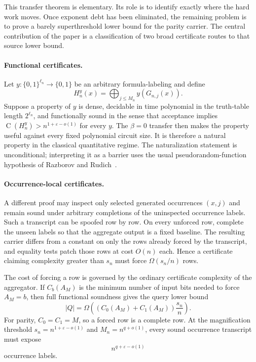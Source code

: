 \documentclass[11pt]{article}
\theoremstyle{definition}
\newcommand{\bits}{\{0,1\}}
\newcommand{\Ckt}{\operatorname{C}}
\newcommand{\eps}{\varepsilon}
\begin{document}
This transfer theorem is elementary. Its role is to identify exactly where the hard work moves. Once exponent debt has been eliminated, the remaining problem is to prove a barely superthreshold lower bound for the parity carrier. The central contribution of the paper is a classification of two broad certificate routes to that source lower bound.

\paragraph{Functional certificates.}
Let $y:\bits^{\ell_n}\to\bits$ be an arbitrary formula-labeling and define
\[
  H_n^y(x)=\bigoplus_{j\le M_n}y(G_{n,j}(x)).
\]
Suppose a property of $y$ is dense, decidable in time polynomial in the truth-table length $2^{\ell_n}$, and functionally sound in the sense that acceptance implies $\Ckt(H_n^y)>n^{1+\eps-o(1)}$ for every $y$. The $\beta=0$ transfer then makes the property useful against every fixed polynomial circuit size. It is therefore a natural property in the classical quantitative regime. The naturalization statement is unconditional; interpreting it as a barrier uses the usual pseudorandom-function hypothesis of Razborov and Rudich~\cite{RR97,GGM86}.

\paragraph{Occurrence-local certificates.}
A different proof may inspect only selected generated occurrences $(x,j)$ and remain sound under arbitrary completions of the uninspected occurrence labels. Such a transcript can be spoofed row by row. On every unforced row, complete the unseen labels so that the aggregate output is a fixed baseline. The resulting carrier differs from a constant on only the rows already forced by the transcript, and equality tests patch those rows at cost $O(n)$ each. Hence a certificate claiming complexity greater than $s_n$ must force $\Omega(s_n/n)$ rows.

The cost of forcing a row is governed by the ordinary certificate complexity of the aggregator. If $C_b(A_M)$ is the minimum number of input bits needed to force $A_M=b$, then full functional soundness gives the query lower bound
\begin{equation}\label{eq:intro-main}
  |Q|
  =\Omega\!\left((C_0(A_M)+C_1(A_M))\frac{s_n}{n}\right).
\end{equation}
For parity, $C_0=C_1=M$, so a forced row is a complete row. At the magnification threshold $s_n=n^{1+\eps-o(1)}$ and $M_n=n^{q+o(1)}$, every sound occurrence transcript must expose
\[
  n^{q+\eps-o(1)}
\]
occurrence labels.
\end{document}
